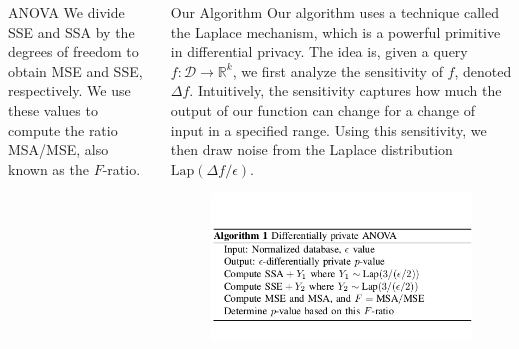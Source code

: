 \documentclass[final]{beamer}
\newlength{\onecolwid}
\newlength{\twocolwid}
\begin{document}
\begin{frame}[t]
\begin{columns}[t]
\begin{column}{\twocolwid}
\begin{columns}[t,totalwidth=\twocolwid]
\begin{column}{\onecolwid}
\begin{block}{ANOVA}
We divide SSE and SSA by the degrees of freedom to obtain MSE and SSE, respectively. 
We use these values to compute the ratio MSA/MSE, also known as the $F$-ratio. 

\end{block}



\end{column} %

\begin{column}{\onecolwid}\vspace{-.6in} %


\begin{block}{Our Algorithm}
Our algorithm uses a technique called the Laplace mechanism, which is a powerful primitive in 
differential privacy. The idea is, given a query $f:\mathcal{D}\to\mathbb{R}^{k}$, we first analyze the sensitivity of $f$, denoted $\Delta f$. Intuitively, the sensitivity captures how much the output of our function can change for a change of input in a specified range. Using this sensitivity, we then draw noise from the Laplace distribution $\text{Lap}(\Delta f / \epsilon)$.

\begin{figure}
\includegraphics[width=1.0\linewidth]{algorithm.png}
\end{figure}


\end{block}
\end{column}
\end{columns}
\end{column}
\end{columns}
\end{frame}
\end{document}

